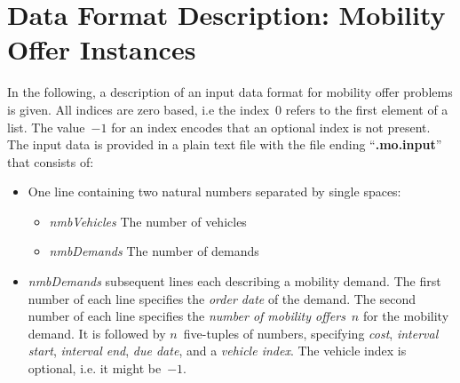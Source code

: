 \documentclass[11pt,paper=a4]{article}
\begin{document}
\section*{Data Format Description: Mobility Offer Instances}

In the following, a description of an input data format for
mobility offer problems is given.
All indices are zero based, i.e the index~0 refers to the first element of a list.
The value~$-1$ for an index encodes that an optional index is not present.
The input data is provided in a plain text file
with the file ending \enquote{{\bf .mo.input}} that consists of:

\begin{itemize}
	\item One line containing two natural numbers
		  separated by single spaces:
		\begin{itemize}
			\item \emph{nmbVehicles} The number of vehicles
			\item \emph{nmbDemands} The number of demands
		\end{itemize}

	\item \emph{nmbDemands} subsequent lines each describing a mobility demand.
		The first number of each line specifies the \emph{order date} of the demand.
		The second number of each line specifies the \emph{number of mobility offers}~$n$ for the mobility demand.
		It is followed by $n$~five-tuples of numbers, specifying
		\emph{cost},
		\emph{interval start},
		\emph{interval end},
		\emph{due date},
		and a \emph{vehicle index}.
		The vehicle index is optional, i.e. it might be~$-1$.
\end{itemize}
\end{document}
